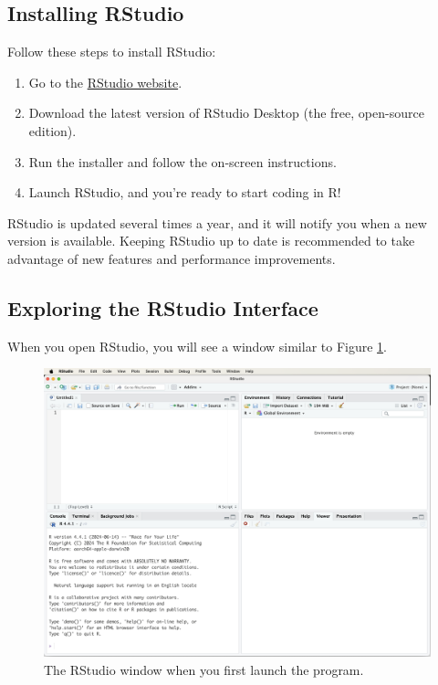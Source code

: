 \documentclass[
]{book}
\providecommand{\tightlist}{%
  \setlength{\itemsep}{0pt}\setlength{\parskip}{0pt}}
\theoremstyle{definition}
\theoremstyle{definition}
\theoremstyle{definition}
\theoremstyle{definition}
\theoremstyle{remark}
\begin{document}
\subsection*{Installing RStudio}\label{installing-rstudio}

Follow these steps to install RStudio:

\begin{enumerate}
\def\labelenumi{\arabic{enumi}.}
\tightlist
\item
  Go to the \href{http://www.rstudio.com/download}{RStudio website}.\\
\item
  Download the latest version of RStudio Desktop (the free, open-source edition).\\
\item
  Run the installer and follow the on-screen instructions.\\
\item
  Launch RStudio, and you're ready to start coding in R!
\end{enumerate}

RStudio is updated several times a year, and it will notify you when a new version is available. Keeping RStudio up to date is recommended to take advantage of new features and performance improvements.

\subsection*{Exploring the RStudio Interface}\label{exploring-the-rstudio-interface}

When you open RStudio, you will see a window similar to Figure \ref{fig:RStudio-window-1}.

\begin{figure}

{\centering \includegraphics[width=0.7\linewidth]{images/RStudio-window-1} 

}

\caption{The RStudio window when you first launch the program.}\label{fig:RStudio-window-1}
\end{figure}
\end{document}
